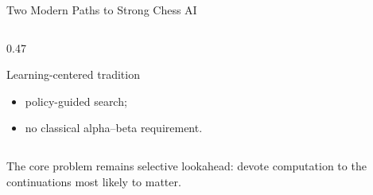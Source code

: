 \documentclass[aspectratio=169,10pt]{beamer}
\begin{document}
\begin{frame}[shrink=18]{Two Modern Paths to Strong Chess AI}
\begin{columns}[T,onlytextwidth]
\begin{column}{0.47\textwidth}
\begin{block}{Learning-centered tradition}
\begin{itemize}
          \item policy-guided search;

          \item no classical alpha--beta requirement.

        \end{itemize}

      \end{block}

    \end{column}

  \end{columns}

  \begin{keyidea}

    The core problem remains selective lookahead: devote computation to the continuations most likely to matter.

  \end{keyidea}

\end{frame}



\end{document}
